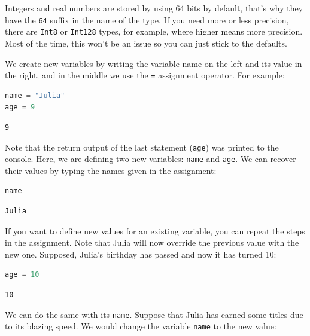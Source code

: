 \documentclass[
  notoc %
]{tufte-book}
\newcommand{\passthrough}[1]{#1}
\begin{document}
Integers and real numbers are stored by using 64 bits by default, that's
why they have the \passthrough{\lstinline!64!} suffix in the name of the
type. If you need more or less precision, there are
\passthrough{\lstinline!Int8!} or \passthrough{\lstinline!Int128!}
types, for example, where higher means more precision. Most of the time,
this won't be an issue so you can just stick to the defaults.

We create new variables by writing the variable name on the left and its
value in the right, and in the middle we use the
\passthrough{\lstinline!=!} assignment operator. For example:

\begin{lstlisting}[language=Julia]
name = "Julia"
age = 9
\end{lstlisting}

\begin{lstlisting}[language=Output]
9
\end{lstlisting}

Note that the return output of the last statement
(\passthrough{\lstinline!age!}) was printed to the console. Here, we are
defining two new variables: \passthrough{\lstinline!name!} and
\passthrough{\lstinline!age!}. We can recover their values by typing the
names given in the assignment:

\begin{lstlisting}[language=Julia]
name
\end{lstlisting}

\begin{lstlisting}[language=Output]
Julia
\end{lstlisting}

If you want to define new values for an existing variable, you can
repeat the steps in the assignment. Note that Julia will now override
the previous value with the new one. Supposed, Julia's birthday has
passed and now it has turned 10:

\begin{lstlisting}[language=Julia]
age = 10
\end{lstlisting}

\begin{lstlisting}[language=Output]
10
\end{lstlisting}

We can do the same with its \passthrough{\lstinline!name!}. Suppose that
Julia has earned some titles due to its blazing speed. We would change
the variable \passthrough{\lstinline!name!} to the new value:
\end{document}
